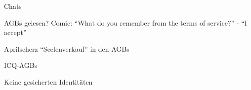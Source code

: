 \begin{frame}{Chats}
\end{frame}

\begin{frame}{AGBs gelesen?}
Comic: "`What do you remember from the terms of service?"' - "`I accept"'

Aprilscherz "`Seelenverkauf"' in den AGBs

ICQ-AGBs
\end{frame}

\begin{frame}{Keine gesicherten Identitäten}
\end{frame}


